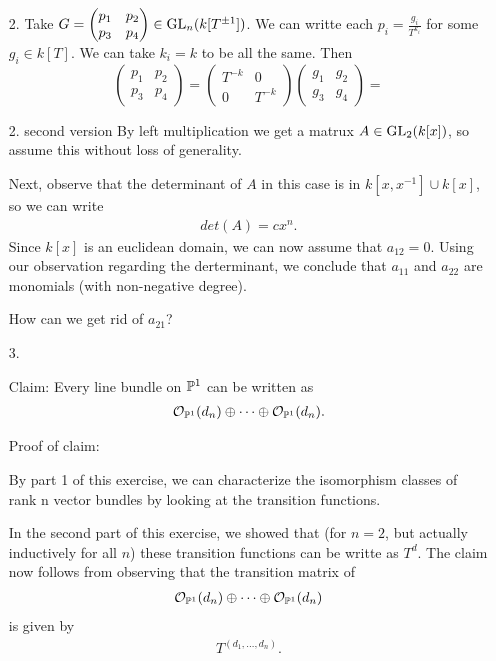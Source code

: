 \begin{exercise}{2}
\begin{enumerate}
    \item[2.]{
            Take $G = \begin{pmatrix} p_1 & p_2 \\ p_3 & p_4 \end{pmatrix} \in
                \operatorname{GL}_n(k[T^{\pm 1}])$. We can writte each $p_i =
                \frac{g_i}{T^{k_i}}$ for some $g_i \in k[T]$. We can take $k_i =
                k$ to be all the same. Then
                \begin{equation}
                    \begin{pmatrix} p_1 & p_2 \\ p_3 & p_4 \end{pmatrix} =
                        \begin{pmatrix} T^{-k} & 0 \\ 0 & T^{-k} \end{pmatrix} 
                    \begin{pmatrix} g_1 & g_2 \\ g_3 & g_4 \end{pmatrix} = 
                \end{equation}
        }
    \item[2. second version]
    By left multiplication we get a matrux $A\in \operatorname{GL}_2(k[x])$, so assume this without loss of generality.

    Next, observe that the determinant of $A$ in this case is in $k[x,x^{-1}]\cup k[x]$, so we can write 
    \begin{align*}
        det(A)=cx^n.
    \end{align*}
    Since $k[x]$ is an euclidean domain, we can now assume that $a_{12}=0$. Using our observation regarding
    the derterminant, we conclude that $a_{11}$ and $a_{22}$ are monomials (with non-negative degree).

    How can we get rid of $a_{21}$?
    \item[3.]{
        Claim: Every line bundle on $\mathbb{P}^1$ can be written as 
        \begin{align*}
            \mathcal{O}_{\mathbb{P}^1}(d_n)\oplus \dots \oplus \mathcal{O}_{\mathbb{P} ^1}(d_n).
        \end{align*}
        
        Proof of claim:

        By part 1 of this exercise, we can characterize the isomorphism classes of rank n vector bundles by looking at the transition functions. 

        In the second part of this exercise, we showed that (for $n=2$, but actually inductively for all $n$) these 
        transition functions can be writte as $T^d$. The claim now follows from observing that the transition matrix of 
        \begin{align*}
            \mathcal{O}_{\mathbb{P}^1}(d_n)\oplus \dots \oplus \mathcal{O}_{\mathbb{P} ^1}(d_n)
        \end{align*}
        is given by
        \begin{align*}
            T^{(d_1,\dots, d_n)}.
        \end{align*}
    }
    \end{enumerate}
\end{exercise}


